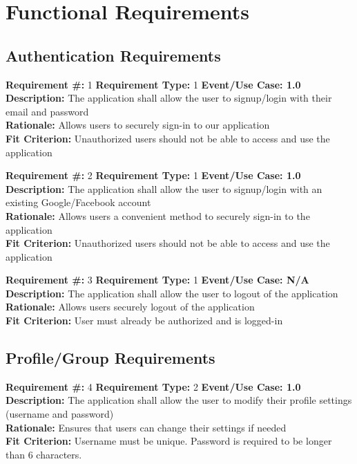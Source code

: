 \documentclass[12pt]{article}
\begin{document}
\section{Functional Requirements}
\noindent

\subsection{Authentication Requirements} 
\noindent

\textbf{Requirement \#:} 1 \quad \textbf{Requirement Type:} 1 \quad \textbf{Event/Use Case: 1.0}
\medskip
\\\textbf{Description:} The application shall allow the user to signup/login with their email and password
\\\textbf{Rationale:} Allows users to securely sign-in to our application
\\\textbf{Fit Criterion:} Unauthorized users should not be able to access and use the application

\bigskip
\textbf{Requirement \#:} 2 \quad \textbf{Requirement Type:} 1 \quad \textbf{Event/Use Case: 1.0}
\medskip
\\\textbf{Description:} The application shall allow the user to signup/login with an existing Google/Facebook account
\\\textbf{Rationale:} Allows users a convenient method to securely sign-in to the application 
\\\textbf{Fit Criterion:} Unauthorized users should not be able to access and use the application

\bigskip
\textbf{Requirement \#:} 3 \quad \textbf{Requirement Type:} 1 \quad \textbf{Event/Use Case: N/A}
\medskip
\\\textbf{Description:} The application shall allow the user to logout of the application 
\\\textbf{Rationale:} Allows users securely logout of the application 
\\\textbf{Fit Criterion:} User must already be authorized and is logged-in

\subsection{Profile/Group Requirements} 
\noindent

\textbf{Requirement \#:} 4 \quad \textbf{Requirement Type:} 2 \quad \textbf{Event/Use Case: 1.0}
\medskip
\\\textbf{Description:} The application shall allow the user to modify their profile settings (username and password)
\\\textbf{Rationale:} Ensures that users can change their settings if needed
\\\textbf{Fit Criterion:} Username must be unique. Password is required to be longer than 6 characters.
\end{document}
